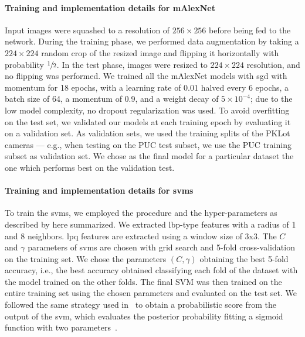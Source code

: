 \paragraph{Training and implementation details for mAlexNet}
Input images were squashed to a resolution of $256\times256$ before being fed to the network.
During the training phase, we performed data augmentation by taking a $224\times224$ random crop of the resized image and flipping it horizontally with probability $\sfrac{1}{2}$.
In the test phase, images were resized to $224\times224$ resolution, and no flipping was performed.
We trained all the mAlexNet models with \gls{sgd} with momentum for 18 epochs, with a learning rate of 0.01 halved every 6 epochs, a batch size of 64, a momentum of 0.9, and a weight decay of $5\times 10^{-4}$;
due to the low model complexity, no dropout regularization was used.
To avoid overfitting on the test set, we validated our models at each training epoch by evaluating it on a validation set.
As validation sets, we used the training splits of the PKLot cameras --- e.g., when testing on the PUC test subset, we use the PUC training subset as validation set.
We chose as the final model for a particular dataset the one which performs best on the validation test.

\paragraph{Training and implementation details for \glspl{svm}}
To train the \glspl{svm}, we employed the procedure and the hyper-parameters as described by \citet{de2015pklot} here summarized.
We extracted \gls{lbp}-type features with a radius of 1 and 8 neighbors.
\gls{lpq} features are extracted using a window size of 3x3.
The $C$ and $\gamma$ parameters of \glspl{svm} are chosen with grid search and 5-fold cross-validation on the training set.
We chose the parameters $(C,\gamma)$ obtaining the best 5-fold accuracy, i.e., the best accuracy obtained classifying each fold of the dataset with the model trained on the other folds.
The final SVM was then trained on the entire training set using the chosen parameters and evaluated on the test set.
We followed the same strategy used in~\cite{de2015pklot} to obtain a probabilistic score from the output of the \gls{svm}, which evaluates the posterior probability fitting a sigmoid function with two parameters~\cite{platt1999probabilistic}.

